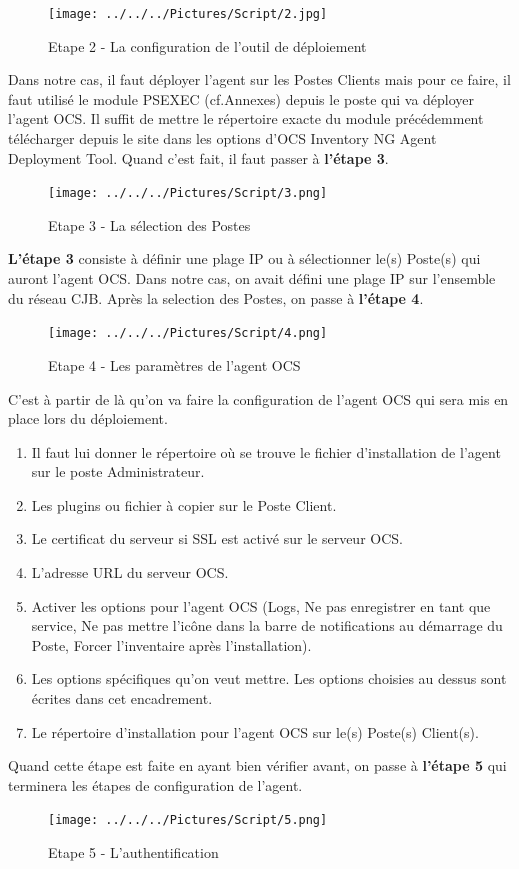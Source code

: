 \documentclass[11pt,a4paper,oneside]{article}
\begin{document}
\begin{figure}[hbtp]
  \centering
  \texttt{[image: ../../../Pictures/Script/2.jpg]}
  \caption{Etape 2 - La configuration de l'outil de déploiement}
\end{figure} 
Dans notre cas, il faut déployer l'agent sur les Postes Clients mais pour ce faire, il faut utilisé le module PSEXEC (cf.Annexes) depuis le poste qui va déployer l'agent OCS. Il suffit de mettre le répertoire exacte du module précédemment télécharger depuis le site dans les options d'OCS Inventory NG Agent Deployment Tool. Quand c'est fait, il faut passer à \textbf{l'étape 3}. \\

\begin{figure}[hbtp]
 \centering
 \texttt{[image: ../../../Pictures/Script/3.png]}
 \caption{Etape 3 - La sélection des Postes}
 \end{figure}
  
\textbf{L'étape 3} consiste à définir une plage IP  ou à sélectionner le(s) Poste(s) qui auront l'agent OCS. Dans notre cas, on avait défini une plage IP sur l'ensemble du réseau CJB. Après la selection des Postes, on passe à \textbf{l'étape 4}.
\newpage

\begin{figure}[hbtp]
\centering
\texttt{[image: ../../../Pictures/Script/4.png]}
\caption{Etape 4 - Les paramètres de l'agent OCS}
\end{figure}

C'est à partir de là qu'on va faire la configuration de l'agent OCS qui sera mis en place lors du déploiement.  
\begin{enumerate}
\item Il faut lui donner le répertoire où se trouve le fichier d'installation de l'agent sur le poste Administrateur.
\item Les plugins ou fichier à copier sur le Poste Client.
\item Le certificat du serveur si SSL est activé sur le serveur OCS.
\item L'adresse URL du serveur OCS.
\item Activer les options pour l'agent OCS (Logs, Ne pas enregistrer en tant que service, Ne pas mettre l'icône dans la barre de notifications au démarrage du Poste, Forcer l'inventaire après l'installation).
\item Les options spécifiques qu'on veut mettre. Les options choisies au dessus sont écrites dans cet encadrement.
\item Le répertoire d'installation pour l'agent OCS sur le(s) Poste(s) Client(s).
\end{enumerate}
Quand cette étape est faite en ayant bien vérifier avant, on passe à \textbf{l'étape 5} qui terminera les étapes de configuration de l'agent.
\newpage
\begin{figure}[hbtp]
\centering
\texttt{[image: ../../../Pictures/Script/5.png]}
\caption{Etape 5 - L'authentification}
\end{figure}
\end{document}

